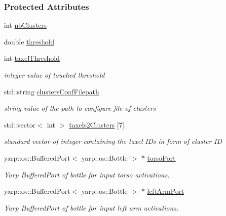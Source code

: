 \subsubsection*{Protected Attributes}
\begin{DoxyCompactItemize}
\item 
int \hyperlink{group__touchDetector_aa04ee21c0927d0520223ecd59be4fd29}{nb\+Clusters}
\item 
double \hyperlink{group__touchDetector_a876e80882e9772d72a1062f1bd67aca6}{threshold}
\item 
int \hyperlink{group__touchDetector_a2d699150315f222848ecf5e2d2a345f7}{taxel\+Threshold}
\begin{DoxyCompactList}\small\item\em integer value of touched threshold \end{DoxyCompactList}\item 
std\+::string \hyperlink{group__touchDetector_af4ffe4e72ec3978af45f63f5f1721ff0}{clusters\+Conf\+Filepath}
\begin{DoxyCompactList}\small\item\em string value of the path to configure file of clusters \end{DoxyCompactList}\item 
std\+::vector$<$ int $>$ \hyperlink{group__touchDetector_a0e1cb59b32d06c38053bf97c2c11290b}{taxels2\+Clusters} \mbox{[}7\mbox{]}
\begin{DoxyCompactList}\small\item\em standard vector of integer containing the taxel I\+Ds in form of cluster ID \end{DoxyCompactList}\item 
yarp\+::os\+::\+Buffered\+Port$<$ yarp\+::os\+::\+Bottle $>$ $\ast$ \hyperlink{group__touchDetector_a40c56d22bab1fdb6876c5ff7ea06e9e8}{torso\+Port}
\begin{DoxyCompactList}\small\item\em Yarp Buffered\+Port of bottle for input torso activations. \end{DoxyCompactList}\item 
yarp\+::os\+::\+Buffered\+Port$<$ yarp\+::os\+::\+Bottle $>$ $\ast$ \hyperlink{group__touchDetector_a975fc42c10d903e8006cb49800bf9589}{left\+Arm\+Port}
\begin{DoxyCompactList}\small\item\em Yarp Buffered\+Port of bottle for input left arm activations. \end{DoxyCompactList}\item 

\end{DoxyCompactItemize}
